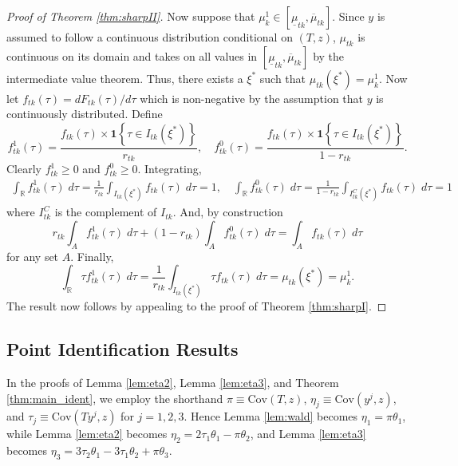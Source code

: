 \begin{proof}[Proof of Theorem \ref{thm:sharpII}]
Now suppose that $\mu^1_{k} \in \left[\underline{\mu}_{tk}, \overline{\mu}_{tk} \right]$.
Since $y$ is assumed to follow a continuous distribution conditional on $(T,z)$, $\mu_{tk}$ is continuous on its domain and takes on all values in $\left[ \underline{\mu}_{tk}, \overline{\mu}_{tk} \right]$ by the intermediate value theorem.
Thus, there exists a $\xi^*$ such that $\mu_{tk}(\xi^*) = \mu^1_{k}$.
Now let $f_{tk}(\tau) = dF_{tk}(\tau)/d\tau$ which is non-negative by the assumption that $y$ is continuously distributed.
Define 
\[
  f^1_{tk}(\tau) = \frac{f_{tk}(\tau)\times \mathbf{1}\left\{ \tau \in I_{tk}(\xi^*) \right\}}{r_{tk}}, \quad
  f^0_{tk}(\tau) = \frac{f_{tk}(\tau) \times \mathbf{1}\left\{ \tau \in I_{tk}(\xi^*) \right\}}{1 - r_{tk}}.
\]
Clearly $f_{tk}^1\geq 0$ and $f^0_{tk} \geq 0$.
Integrating, 
\begin{align*}
  \int_{\mathbb{R}} f_{tk}^1(\tau) \; d\tau = \frac{1}{r_{tk}}\int_{I_{tk}(\xi^*)} f_{tk}(\tau)\; d\tau = 1, \quad
  \int_{\mathbb{R}} f_{tk}^0(\tau) \; d\tau = \frac{1}{1 - r_{tk}}\int_{I^C_{tk}(\xi^*)} f_{tk}(\tau)\; d\tau = 1
\end{align*}
where $I_{tk}^C$ is the complement of $I_{tk}$.
And, by construction
\[
  r_{tk} \int_A f_{tk}^1(\tau) \; d\tau + (1 - r_{tk}) \int_A f_{tk}^0(\tau) \; d\tau = \int_A f_{tk}(\tau)\; d\tau
\]
for any set $A$. 
Finally,
\[
  \int_{\mathbb{R}} \tau f_{tk}^1(\tau) \; d\tau = \frac{1}{r_{tk}} \int_{I_{tk}(\xi^*)} \tau f_{tk}(\tau)\; d\tau = \mu_{tk}(\xi^*) = \mu^1_{k}.
\]
The result now follows by appealing to the proof of Theorem \ref{thm:sharpI}.
\end{proof}

\subsection{Point Identification Results}
In the proofs of Lemma \ref{lem:eta2}, Lemma \ref{lem:eta3}, and Theorem \ref{thm:main_ident}, we employ the shorthand $\pi \equiv \mbox{Cov}(T,z)$, $\eta_j \equiv \mbox{Cov}(y^j,z)$, and $\tau_j \equiv \mbox{Cov}(Ty^j,z)$ for $j = 1, 2, 3$.
Hence Lemma \ref{lem:wald} becomes $\eta_1 = \pi\theta_1$, while Lemma \ref{lem:eta2} becomes $\eta_2 =  2\tau_1 \theta_1 - \pi \theta_2$, 
and Lemma \ref{lem:eta3} becomes $\eta_3 = 3\tau_2 \theta_1 - 3\tau_1 \theta_2 + \pi\theta_3$.

